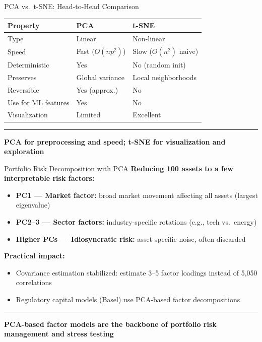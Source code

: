 \documentclass[8pt,aspectratio=169]{beamer}
\newcommand{\bottomnote}[1]{%
\vfill
\vspace{-2mm}
\textcolor{mllavender2}{\rule{\textwidth}{0.4pt}}
\vspace{1mm}
\footnotesize
\textbf{#1}
}
\newcommand{\highlight}[1]{\textcolor{mlorange}{\textbf{#1}}}
\begin{document}
\begin{frame}[t]{PCA vs.\ t-SNE: Head-to-Head Comparison}
\vspace{0.3em}
\begin{center}
\begin{tabular}{@{}lll@{}}
\toprule
\textbf{Property} & \textbf{PCA} & \textbf{t-SNE} \\
\midrule
Type & Linear & Non-linear \\
Speed & Fast ($O(np^2)$) & Slow ($O(n^2)$ naive) \\
Deterministic & Yes & No (random init) \\
Preserves & Global variance & Local neighborhoods \\
Reversible & Yes (approx.) & No \\
Use for ML features & Yes & No \\
Visualization & Limited & Excellent \\
\bottomrule
\end{tabular}
\end{center}
\bottomnote{PCA for preprocessing and speed; t-SNE for visualization and exploration}
\end{frame}

\begin{frame}[t]{Portfolio Risk Decomposition with PCA}
\textbf{Reducing 100 assets to a few interpretable risk factors:}
\begin{itemize}
  \item \highlight{PC1 --- Market factor:} broad market movement affecting all assets (largest eigenvalue)
  \item \highlight{PC2--3 --- Sector factors:} industry-specific rotations (e.g., tech vs.\ energy)
  \item \highlight{Higher PCs --- Idiosyncratic risk:} asset-specific noise, often discarded
\end{itemize}
\vspace{0.5em}
\textbf{Practical impact:}
\begin{itemize}
  \item Covariance estimation stabilized: estimate 3--5 factor loadings instead of 5{,}050 correlations
  \item Regulatory capital models (Basel) use PCA-based factor decompositions
\end{itemize}
\bottomnote{PCA-based factor models are the backbone of portfolio risk management and stress testing}
\end{frame}
\end{document}
